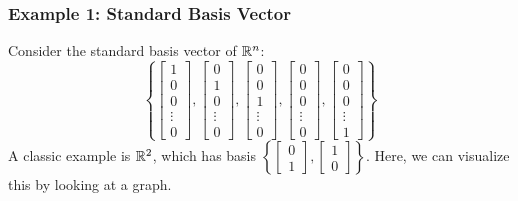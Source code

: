 \documentclass[letterpaper]{article}
\begin{document}
\subsubsection{Example 1: Standard Basis Vector}
Consider the standard basis vector of $\mathbb{R}^n$: 
\[\left\{
    \begin{bmatrix}
        1 \\ 0 \\ 0 \\ \vdots \\ 0 
    \end{bmatrix}, \begin{bmatrix}
        0 \\ 1 \\ 0 \\ \vdots \\ 0 
    \end{bmatrix}, \begin{bmatrix}
        0 \\ 0 \\ 1 \\ \vdots \\ 0 
    \end{bmatrix}, \begin{bmatrix}
        0 \\ 0 \\ 0 \\ \vdots \\ 0 
    \end{bmatrix}, \begin{bmatrix}
        0 \\ 0 \\ 0 \\ \vdots \\ 1 
    \end{bmatrix}
\right\}\]
A classic example is $\mathbb{R}^2$, which has basis $\left\{\begin{bmatrix}
    0 \\ 1
\end{bmatrix}, \begin{bmatrix}
    1 \\ 0
\end{bmatrix}\right\}$. Here, we can visualize this by looking at a graph.
\end{document}
